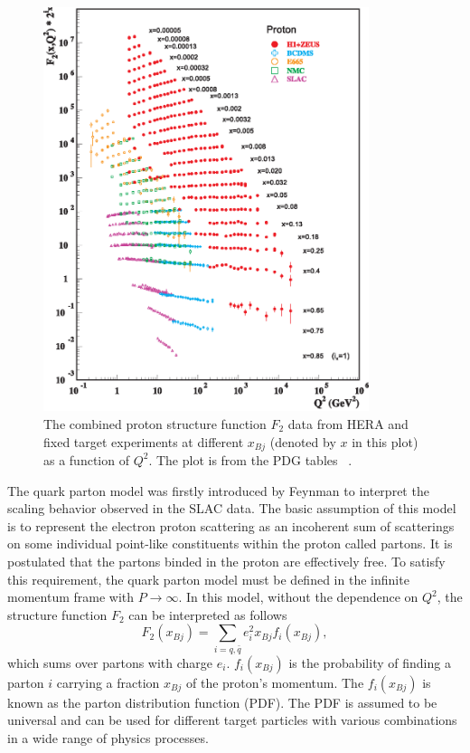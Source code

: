 \begin{figure}
\centering
\includegraphics[width=0.85\textwidth]{plots/chpt2/f2collider_logf2.eps}
\caption[Combined proton structure function F2 distribution from different experiments] {
The combined proton structure function $F_{2}$ data from HERA and fixed target experiments at different $x_{Bj}$ (denoted by $x$ in this plot) as a function of $Q^{2}$. The plot is from the PDG tables ~\cite{Beringer:1900zz}.}
\label{fig:F2_pdg}
\end{figure}

The quark parton model was firstly introduced by Feynman to interpret the
scaling behavior observed in the SLAC data. The basic assumption of this model
is to represent the electron proton scattering as an incoherent sum of
scatterings on some individual point-like constituents within the proton called
partons. It is postulated that the partons binded in the proton are effectively
free. To satisfy this requirement, the quark parton model must be defined in the
infinite momentum frame with $P\rightarrow\infty$. In this model, without the
dependence on $Q^{2}$, the structure function $F_{2}$ can be interpreted as
follows
\begin{equation}
F_{2}(x_{Bj})=\sum_{i=q,\bar{q}}e^{2}_{i}x_{Bj}f_{i}(x_{Bj}),
\label{eqn:F2_QPM}
\end{equation}
which sums over partons with charge $e_{i}$. $f_{i}(x_{Bj})$ is the probability
of finding a parton $i$ carrying a fraction $x_{Bj}$ of the proton's momentum.
The $f_{i}(x_{Bj})$ is known as the parton distribution function (PDF). The PDF
is assumed to be universal and can be used for different target particles with
various combinations in a wide range of physics processes. 

